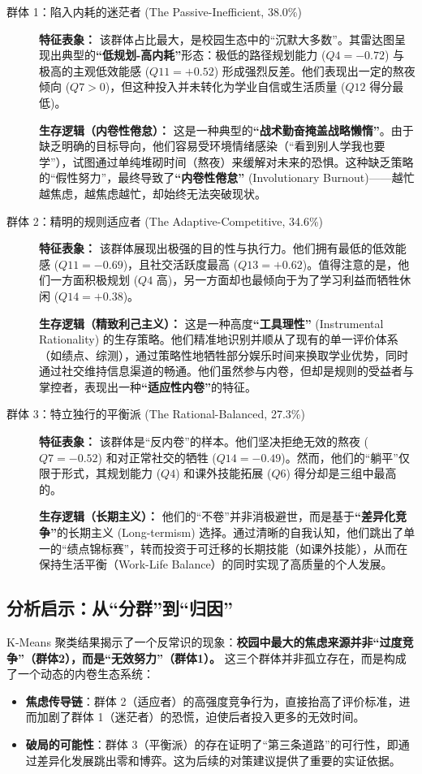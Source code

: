 \documentclass[win,thesis]{hustreport} %
\begin{document}
\begin{description}
	\item[群体 1：陷入内耗的迷茫者 (The Passive-Inefficient, 38.0\%)] 
	\textbf{特征表象：} 该群体占比最大，是校园生态中的“沉默大多数”。其雷达图呈现出典型的\textbf{“低规划-高内耗”}形态：极低的路径规划能力 ($Q4=-0.72$) 与极高的主观低效能感 ($Q11=+0.52$) 形成强烈反差。他们表现出一定的熬夜倾向 ($Q7>0$)，但这种投入并未转化为学业自信或生活质量 ($Q12$ 得分最低)。
	
	\textbf{生存逻辑（内卷性倦怠）：} 这是一种典型的\textbf{“战术勤奋掩盖战略懒惰”}。由于缺乏明确的目标导向，他们容易受环境情绪感染（“看到别人学我也要学”），试图通过单纯堆砌时间（熬夜）来缓解对未来的恐惧。这种缺乏策略的“假性努力”，最终导致了\textbf{“内卷性倦怠”} (Involutionary Burnout)——越忙越焦虑，越焦虑越忙，却始终无法突破现状。
	
	\item[群体 2：精明的规则适应者 (The Adaptive-Competitive, 34.6\%)]
	\textbf{特征表象：} 该群体展现出极强的目的性与执行力。他们拥有最低的低效能感 ($Q11=-0.69$)，且社交活跃度最高 ($Q13=+0.62$)。值得注意的是，他们一方面积极规划 ($Q4$ 高)，另一方面却也最倾向于为了学习利益而牺牲休闲 ($Q14=+0.38$)。
	
	\textbf{生存逻辑（精致利己主义）：} 这是一种高度\textbf{“工具理性”} (Instrumental Rationality) 的生存策略。他们精准地识别并顺从了现有的单一评价体系（如绩点、综测），通过策略性地牺牲部分娱乐时间来换取学业优势，同时通过社交维持信息渠道的畅通。他们虽然参与内卷，但却是规则的受益者与掌控者，表现出一种\textbf{“适应性内卷”}的特征。
	
	\item[群体 3：特立独行的平衡派 (The Rational-Balanced, 27.3\%)]
	\textbf{特征表象：} 该群体是“反内卷”的样本。他们坚决拒绝无效的熬夜 ($Q7=-0.52$) 和对正常社交的牺牲 ($Q14=-0.49$)。然而，他们的“躺平”仅限于形式，其规划能力 ($Q4$) 和课外技能拓展 ($Q6$) 得分却是三组中最高的。
	
	\textbf{生存逻辑（长期主义）：} 他们的“不卷”并非消极避世，而是基于\textbf{“差异化竞争”}的长期主义 (Long-termism) 选择。通过清晰的自我认知，他们跳出了单一的“绩点锦标赛”，转而投资于可迁移的长期技能（如课外技能），从而在保持生活平衡（Work-Life Balance）的同时实现了高质量的个人发展。
\end{description}

\subsection{分析启示：从“分群”到“归因”}
K-Means 聚类结果揭示了一个反常识的现象：\textbf{校园中最大的焦虑来源并非“过度竞争”（群体2），而是“无效努力”（群体1）。} 
这三个群体并非孤立存在，而是构成了一个动态的内卷生态系统：
\begin{itemize}
	\item \textbf{焦虑传导链}：群体 2（适应者）的高强度竞争行为，直接抬高了评价标准，进而加剧了群体 1（迷茫者）的恐慌，迫使后者投入更多的无效时间。
	\item \textbf{破局的可能性}：群体 3（平衡派）的存在证明了“第三条道路”的可行性，即通过差异化发展跳出零和博弈。这为后续的对策建议提供了重要的实证依据。
\end{itemize}
\end{document}
